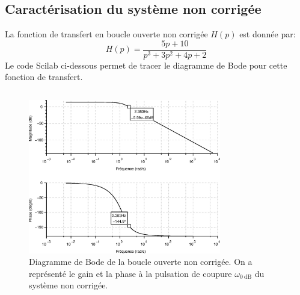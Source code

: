 \subsection*{Caractérisation du système non corrigée}
La fonction de transfert en boucle ouverte non corrigée $H(p)$ est donnée par:
\[
    H(p)=\dfrac{5p+10}{p^3+3p^2+4p+2}
\]
Le code Scilab ci-dessous permet de tracer le diagramme de Bode pour cette
fonction de transfert.
\inputminted{scilab}{scilab/code_q1_chap_correction.sce}
\begin{figure}
    \centering
    \includegraphics[width=0.75\textwidth]{fig/chap_correction/bode_BONC.eps}
    \caption{Diagramme de Bode de la boucle ouverte non corrigée. 
             On a représenté le gain et la phase à la pulsation de coupure 
             $\omega_{\SI{0}{\dB}}$ du système non corrigée.}
\end{figure}
